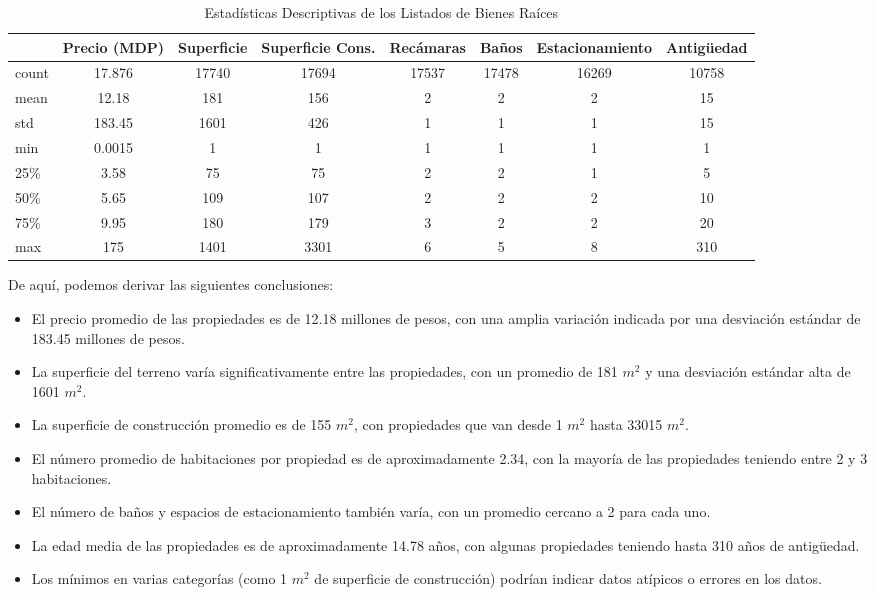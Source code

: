 \begin{table}[h!]
\centering
\caption{Estadísticas Descriptivas de los Listados de Bienes Raíces}
\label{table:analisis_descriptivo}
\tiny %
\begin{tabular}{
  l
  S[table-format=2.2]
  S[table-format=5.0]
  S[table-format=5.0]
  S[table-format=2.0]
  S[table-format=2.0]
  S[table-format=1.0]
  S[table-format=3.0]
}
\toprule
  {} & {Precio (MDP)} & {Superficie} & {Superficie Cons.} & {Recámaras} & {Baños} & {Estacionamiento} & {Antigüedad} \\
\midrule
count & 17.876 & 17740 & 17694 & 17537 & 17478 & 16269 & 10758 \\
mean  & 12.18 & 181 & 156 & 2 & 2 & 2 & 15 \\
std   & 183.45 & 1601 & 426 & 1 & 1 & 1 & 15 \\
min   & 0.0015 & 1 & 1 & 1 & 1 & 1 & 1 \\
25\%  & 3.58 & 75 & 75 & 2 & 2 & 1 & 5 \\
50\%  & 5.65 & 109 & 107 & 2 & 2 & 2 & 10 \\
75\%  & 9.95 & 180 & 179 & 3 & 2 & 2 & 20 \\
max   & 175 & 1401 & 3301 & 6 & 5 & 8 & 310 \\
\bottomrule
\end{tabular}
\normalsize %
\end{table}

De aquí, podemos derivar las siguientes conclusiones:

\begin{itemize}
  \item El precio promedio de las propiedades es de 12.18 millones de pesos, con una amplia variación indicada por una desviación estándar de 183.45 millones de pesos.
  \item La superficie del terreno varía significativamente entre las propiedades, con un promedio de 181 \(m^2\) y una desviación estándar alta de 1601 \(m^2\).
  \item La superficie de construcción promedio es de 155 \(m^2\), con propiedades que van desde 1 \(m^2\) hasta 33015 \(m^2\).
  \item El número promedio de habitaciones por propiedad es de aproximadamente 2.34, con la mayoría de las propiedades teniendo entre 2 y 3 habitaciones.
  \item El número de baños y espacios de estacionamiento también varía, con un promedio cercano a 2 para cada uno.
  \item La edad media de las propiedades es de aproximadamente 14.78 años, con algunas propiedades teniendo hasta 310 años de antigüedad.
  \item Los mínimos en varias categorías (como 1 \(m^2\) de superficie de construcción) podrían indicar datos atípicos o errores en los datos.
\end{itemize}

